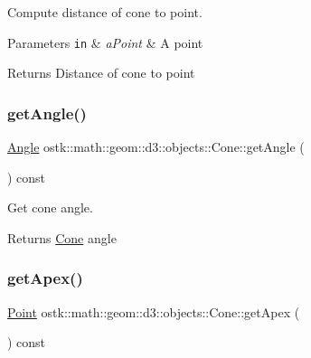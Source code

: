 Compute distance of cone to point. 


\begin{DoxyParams}[1]{Parameters}
\mbox{\tt in}  & {\em a\+Point} & A point \\
\hline
\end{DoxyParams}
\begin{DoxyReturn}{Returns}
Distance of cone to point 
\end{DoxyReturn}
\mbox{\label{classostk_1_1math_1_1geom_1_1d3_1_1objects_1_1_cone_ac288545383fe1514951ce13f1e7611f3}} 
\subsubsection{\texorpdfstring{get\+Angle()}{getAngle()}}
{\footnotesize\ttfamily \hyperlink{classostk_1_1math_1_1geom_1_1_angle}{Angle} ostk\+::math\+::geom\+::d3\+::objects\+::\+Cone\+::get\+Angle (\begin{DoxyParamCaption}{ }\end{DoxyParamCaption}) const}



Get cone angle. 

\begin{DoxyReturn}{Returns}
\hyperlink{classostk_1_1math_1_1geom_1_1d3_1_1objects_1_1_cone}{Cone} angle 
\end{DoxyReturn}
\mbox{\label{classostk_1_1math_1_1geom_1_1d3_1_1objects_1_1_cone_acc452d4c78df49bf3f15c840d6e15c1f}} 
\subsubsection{\texorpdfstring{get\+Apex()}{getApex()}}
{\footnotesize\ttfamily \hyperlink{classostk_1_1math_1_1geom_1_1d3_1_1objects_1_1_point}{Point} ostk\+::math\+::geom\+::d3\+::objects\+::\+Cone\+::get\+Apex (\begin{DoxyParamCaption}{ }\end{DoxyParamCaption}) const}



